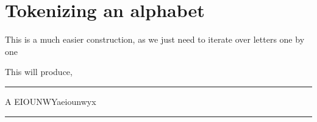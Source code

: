 \section{Tokenizing an alphabet}
This is a much easier construction, as we just need to iterate over letters one by one



\noindent This will produce,

 

\def\acclist#1#2{\def\theletter{#1}\let\next\oneacc\next#2\relax}
\def\Relax{\relax}
\def\oneacc#1{%
  \ifx#1\relax\let\next\relax\else\fbox{\strut \theletter#1} \fi
\next}

\Large

\noindent\rule{10cm}{0.4pt}
\smallskip

\acclist\`{AEIOUNWYaeiounwyx}\par 

\smallskip
\noindent\rule{10cm}{0.4pt}


\normalsize 



